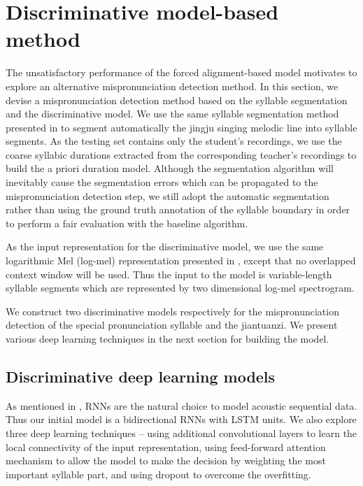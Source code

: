 \section{Discriminative model-based method}\label{sec:ch6:discriminative_model_method}

The unsatisfactory performance of the forced alignment-based model motivates to explore an alternative mispronunciation detection method. In this section, we devise a mispronunciation detection method based on the syllable segmentation and the discriminative model. We use the same syllable segmentation method presented in  to segment automatically the jingju singing melodic line into syllable segments. As the testing set contains only the student's recordings, we use the coarse syllabic durations extracted from the corresponding teacher's recordings to build the a priori duration model. Although the segmentation algorithm will inevitably cause the segmentation errors which can be propagated to the mispronunciation detection step, we still adopt the automatic segmentation rather than using the ground truth annotation of the syllable boundary in order to perform a fair evaluation with the baseline algorithm.

As the input representation for the discriminative model, we use the same logarithmic Mel (log-mel) representation presented in , except that no overlapped context window will be used. Thus the input to the model is variable-length syllable segments which are represented by two dimensional log-mel spectrogram. 

We construct two discriminative models respectively for the mispronunciation detection of the special pronunciation syllable and the \gls{jiantuanzi}. We present various deep learning techniques in the next section for building the model.

\subsection{Discriminative deep learning models}\label{sec:ch6:discriminative_dl_models}

As mentioned in , \gls{RNN}s are the natural choice to model acoustic sequential data. Thus our initial model is a bidirectional \gls{RNN}s with \gls{LSTM} units. We also explore three deep learning techniques -- using additional convolutional layers to learn the local connectivity of the input representation, using feed-forward attention mechanism to allow the model to make the decision by weighting the most important syllable part, and using dropout to overcome the overfitting.

